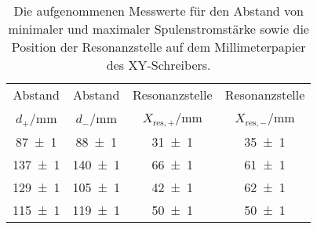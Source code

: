 \begin{table}[!h]
	\centering
	\begin{tabular}{cccc}
		\toprule
		Abstand & Abstand & Resonanzstelle & Resonanzstelle\\
		$d_{+}$/\si{\milli\meter} & $d_{-}$/\si{\milli\meter} & $X_{\mathrm{res,+}}$/\si{\milli\meter} & $X_{\mathrm{res,-}}$/\si{\milli\meter}\\
\midrule
		\num{87(1)} & \num{88(1)} & \num{31(1)} & \num{35(1)}\\
		\num{137(1)} & \num{140(1)} & \num{66(1)} & \num{61(1)}\\
		\num{129(1)} & \num{105(1)} & \num{42(1)} & \num{62(1)}\\
		\num{115(1)} & \num{119(1)} & \num{50(1)} & \num{50(1)}\\
		\bottomrule
	\end{tabular}
	\caption{Die aufgenommenen Messwerte für den Abstand von minimaler und maximaler Spulenstromstärke
sowie die Position der Resonanzstelle auf dem Millimeterpapier des XY-Schreibers. \label{tab:messwerte_X}}
\end{table}
